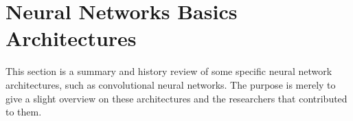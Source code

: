 
\section{Neural Networks Basics Architectures}\label{sec:prev_nn}
This section is a summary and history review of some specific neural network architectures, such as convolutional neural networks.
The purpose is merely to give a slight overview on these architectures and the researchers that contributed to them.
